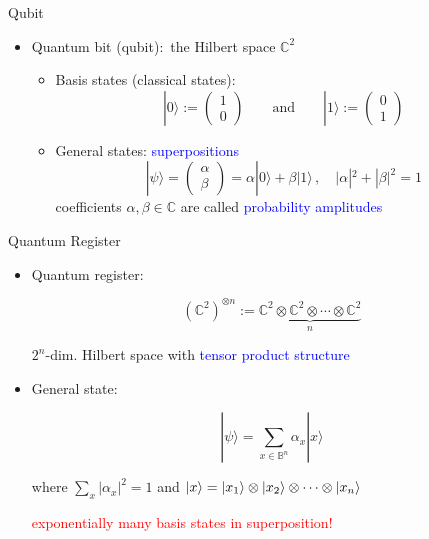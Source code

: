\documentclass[slideColor]{prosper}
\renewcommand{\>}{\rangle}
\newcommand{\<}{\langle}
\newcommand{\C}{{\mathbb C}}
\begin{document}

\begin{slide}{Qubit}

\begin{itemize}
\item Quantum bit (qubit):\, the Hilbert space $\mathbb{C}^2$\,
\bigskip
\begin{itemize}
\item Basis states (classical states):
\[
|0\>:=\left(\begin{array}{c}1\\0\end{array}\right)
\quad\quad\mbox{and}\quad\quad
|1\>:=\left(\begin{array}{c}0\\1\end{array}\right)
\]
\item General states: \textcolor{blue}{superpositions}
\[
|\psi\> = 
\left(
\begin{array}{c}
\alpha\\
\beta
\end{array}
\right)=
\alpha |0\> + \beta |1\>\,,\quad |\alpha|^2+|\beta|^2=1
\]
coefficients $\alpha,\beta\in\mathbb{C}$ are called \textcolor{blue}{probability amplitudes}
\end{itemize}
\end{itemize}

\end{slide}


\begin{slide}{Quantum Register}

\begin{itemize}
\item Quantum register:

\[
(\C^2)^{\otimes n} := \underbrace{\mathbb{C}^2\otimes\mathbb{C}^2\otimes\cdots\otimes\mathbb{C}^2}_{n}
\]

$2^n$-dim. Hilbert space with \textcolor{blue}{tensor product structure}

\bigskip
\item General state:

\[
|\psi\>=\sum_{x\in\mathbb{B}^n} \alpha_x |x\>
\]

where $\sum_{x} |\alpha_x|^2 = 1$ and
$\left\vert{x}\right\rangle=\left\vert{x_1}\right\rangle\otimes\left\vert{x_2}\right\rangle\otimes\cdots\otimes\left\vert{x_n}\right\rangle$

\bigskip
\textcolor{red}{exponentially many basis states in superposition!}

\end{itemize}

\end{slide}
\end{document}
